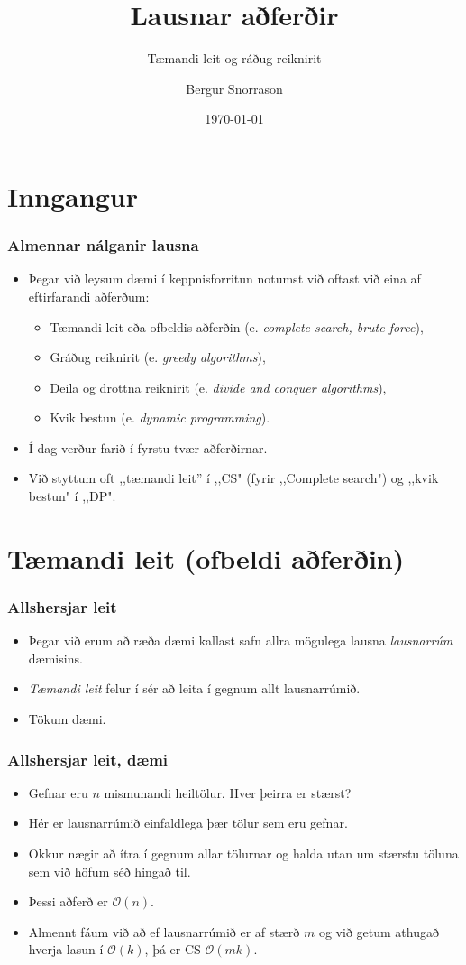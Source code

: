 \documentclass{beamer}
\title{Lausnar aðferðir}
\subtitle{Tæmandi leit og ráðug reiknirit}
\author{Bergur Snorrason}
\date{\today}
\renewcommand\O{\mathcal{O}}
\begin{document}
\frame{\titlepage}

\section{Inngangur}

\begin{frame}
	\frametitle{Almennar nálganir lausna}
\begin{itemize}
	\item<1-> Þegar við leysum dæmi í keppnisforritun notumst við oftast við eina af eftirfarandi aðferðum:
	\begin{itemize}
		\item<2-> Tæmandi leit eða ofbeldis aðferðin (e. \emph{complete search, brute force}),
		\item<3-> Gráðug reiknirit (e. \emph{greedy algorithms}),
		\item<4-> Deila og drottna reiknirit (e. \emph{divide and conquer algorithms}),
		\item<5-> Kvik bestun (e. \emph{dynamic programming}).
	\end{itemize}
	\item<6-> Í dag verður farið í fyrstu tvær aðferðirnar.
	\item<7-> Við styttum oft ,,tæmandi leit'' í ,,CS" (fyrir ,,Complete search") og ,,kvik bestun" í ,,DP".
\end{itemize}
\end{frame}

\section{Tæmandi leit (ofbeldi aðferðin)}

\begin{frame}
	\frametitle{Allshersjar leit}
\begin{itemize}
	\item<1-> Þegar við erum að ræða dæmi kallast safn allra mögulega lausna \emph{lausnarrúm} dæmisins.
	\item<2-> \emph{Tæmandi leit} felur í sér að leita í gegnum allt lausnarrúmið.
	\item<3-> Tökum dæmi.
\end{itemize}
\end{frame}

\begin{frame}
	\frametitle{Allshersjar leit, dæmi}
\begin{itemize}
	\item<1-> Gefnar eru $n$ mismunandi heiltölur. Hver þeirra er stærst?
	\item<2-> Hér er lausnarrúmið einfaldlega þær tölur sem eru gefnar.
	\item<3-> Okkur nægir að ítra í gegnum allar tölurnar og halda utan um stærstu töluna sem við höfum séð hingað til.
	\item<4-> Þessi aðferð er $\O(n)$.
	\item<5-> Almennt fáum við að ef lausnarrúmið er af stærð $m$ og við getum athugað hverja lasun í $\O(k)$, þá er CS $\O(mk)$.
\end{itemize}
\end{frame}
\end{document}
